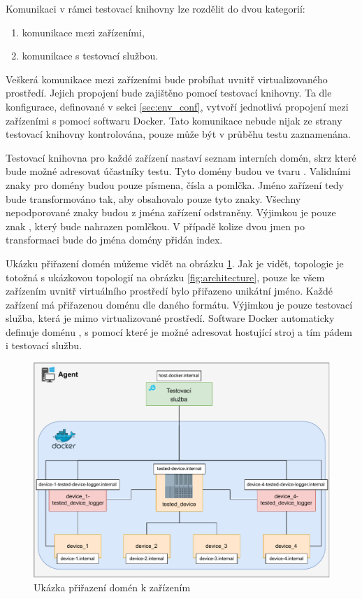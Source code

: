 Komunikaci v rámci testovací knihovny lze rozdělit do dvou kategorií:

\begin{enumerate}
    \item komunikace mezi zařízeními,
    \item komunikace s testovací službou.
\end{enumerate}

Veškerá komunikace mezi zařízeními bude probíhat uvnitř virtualizovaného prostředí. Jejich propojení bude zajištěno pomocí testovací knihovny. Ta dle konfigurace, definované v sekci \ref{sec:env_conf}, vytvoří jednotlivá propojení mezi zařízeními s pomocí softwaru Docker. Tato komunikace nebude nijak ze strany testovací knihovny kontrolována, pouze může být v průběhu testu zaznamenána. 

Testovací knihovna pro každé zařízení nastaví seznam interních domén, skrz které bude možné adresovat účastníky testu. Tyto domény budou ve tvaru . Validními znaky pro domény budou pouze písmena, čísla a pomlčka. Jméno zařízení tedy bude transformováno tak, aby obsahovalo pouze tyto znaky. Všechny nepodporované znaky budou z jména zařízení odstraněny. Výjimkou je pouze znak , který bude nahrazen pomlčkou. V případě kolize dvou jmen po transformaci bude do jména domény přidán index. 

Ukázku přiřazení domén můžeme vidět na obrázku \ref{fig:domain_resolving}. Jak je vidět, topologie je totožná s ukázkovou topologií na obrázku \ref{fig:architecture}, pouze ke všem zařízením uvnitř virtuálního prostředí bylo přiřazeno unikátní jméno. Každé zařízení má přiřazenou doménu dle daného formátu. Výjimkou je pouze testovací služba, která je mimo virtualizované prostředí. Software Docker automaticky definuje doménu , s pomocí které je možné adresovat hostující stroj a tím pádem i testovací službu.

\begin{figure}[htbp]
    \centering 
    \includegraphics[width=\textwidth]{assets/img/domain_resolving.pdf}
    \caption{Ukázka přiřazení domén k zařízením}
    \label{fig:domain_resolving}
\end{figure}


